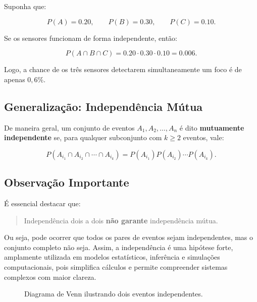 Suponha que:

\[
P(A)=0.20,
\qquad
P(B)=0.30,
\qquad
P(C)=0.10.
\]

Se os sensores funcionam de forma independente, então:

\begin{equation}
P(A\cap B\cap C)
=0.20\cdot0.30\cdot0.10
=0.006.
\end{equation}

Logo, a chance de os três sensores detectarem simultaneamente um foco é de
apenas $0,6\%$.

\bigskip

\subsection*{Generalização: Independência Mútua}

De maneira geral, um conjunto de eventos $A_1,A_2,\dots,A_n$ é dito
\textbf{mutuamente independente} se, para qualquer subconjunto com $k\geq 2$
eventos, vale:

\begin{equation}
P(A_{i_1}\cap A_{i_2}\cap\cdots\cap A_{i_k})
=
P(A_{i_1})P(A_{i_2})\cdots P(A_{i_k}).
\end{equation}

\bigskip

\subsection*{Observação Importante}

É essencial destacar que:

\begin{quote}
Independência dois a dois \textbf{não garante} independência mútua.
\end{quote}

Ou seja, pode ocorrer que todos os pares de eventos sejam independentes,
mas o conjunto completo não seja. Assim, a independência é uma hipótese forte, amplamente utilizada em modelos estatísticos, inferência e simulações computacionais, pois simplifica cálculos
e permite compreender sistemas complexos com maior clareza.


\begin{figure}[h]
\centering
{}
\caption{Diagrama de Venn ilustrando dois eventos independentes.}
\label{fig:venn_independencia}
\end{figure}


